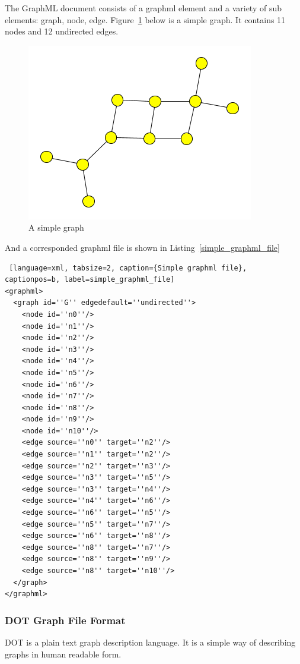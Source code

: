 The GraphML document consists of a graphml element and a variety of sub elements: graph, node, edge. Figure~\ref{fig:simple_graphml} below is a simple graph. It contains 11 nodes and 12 undirected edges.

\begin{figure}[h!]
\centering
\includegraphics[scale=1.0]{pictures/simple.png}
\caption{A simple graph}
\label{fig:simple_graphml}
\end{figure}


And a corresponded graphml file is shown in Listing~\ref{simple_graphml_file}

\begin{center}
\renewcommand{\thelstlisting}{\thesection.\arabic{lstlisting}}
\begin{lstlisting} [language=xml, tabsize=2, caption={Simple graphml file}, captionpos=b, label=simple_graphml_file]
<graphml>
  <graph id=''G'' edgedefault=''undirected''>
    <node id=''n0''/>
    <node id=''n1''/>
    <node id=''n2''/>
    <node id=''n3''/>
    <node id=''n4''/>
    <node id=''n5''/>
    <node id=''n6''/>
    <node id=''n7''/>
    <node id=''n8''/>
    <node id=''n9''/>
    <node id=''n10''/>
    <edge source=''n0'' target=''n2''/>
    <edge source=''n1'' target=''n2''/>
    <edge source=''n2'' target=''n3''/>
    <edge source=''n3'' target=''n5''/>
    <edge source=''n3'' target=''n4''/>
    <edge source=''n4'' target=''n6''/>
    <edge source=''n6'' target=''n5''/>
    <edge source=''n5'' target=''n7''/>
    <edge source=''n6'' target=''n8''/>
    <edge source=''n8'' target=''n7''/>
    <edge source=''n8'' target=''n9''/>
    <edge source=''n8'' target=''n10''/>
  </graph>
</graphml>
\end{lstlisting}
\end{center}

\subsubsection{DOT Graph File Format}
DOT is a plain text graph description language. It is a simple way of describing graphs in human readable form.

